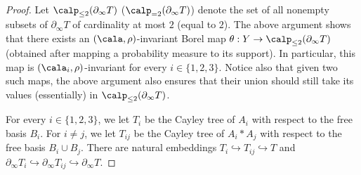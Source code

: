 \begin{proof}
Let $\calp_{\le 2}(\partial_\infty T)$ (\resp $\calp_{=2}(\partial_\infty T)$) denote the set of all nonempty subsets of $\partial_\infty T$ of cardinality at most $2$ (\resp equal to $2$). The above argument shows that there exists an $(\cala,\rho)$-invariant Borel map $\theta:Y\to\calp_{\le 2}(\partial_\infty T)$ (obtained after mapping a probability measure to its support). In particular, this map is $(\cala_i,\rho)$-invariant for every $i\in\{1,2,3\}$. Notice also that given two such maps, the above argument also ensures that their union should still take its values (essentially) in $\calp_{\le 2}(\partial_\infty T)$.

For every $i\in\{1,2,3\}$, we let $T_i$ be the Cayley tree of $A_i$ with respect to the free basis $B_i$. For $i\neq j$, we let $T_{ij}$ be the Cayley tree of $A_i\ast A_j$ with respect to the free basis $B_i\cup B_j$. There are natural embeddings $T_i\hookrightarrow T_{ij}\hookrightarrow T$ and $\partial_\infty T_i\hookrightarrow\partial_\infty T_{ij}\hookrightarrow \partial_\infty T$.


\end{proof}

